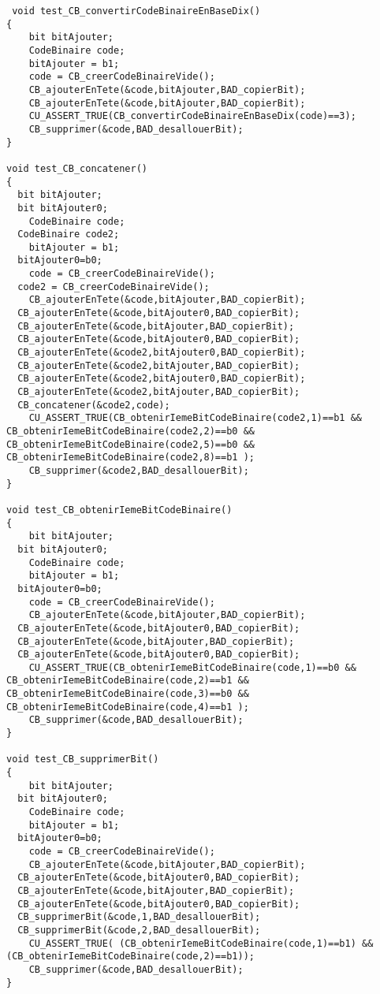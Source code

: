 \begin{verbatim}
 void test_CB_convertirCodeBinaireEnBaseDix()
{
	bit bitAjouter;
	CodeBinaire code;
	bitAjouter = b1;
	code = CB_creerCodeBinaireVide();
	CB_ajouterEnTete(&code,bitAjouter,BAD_copierBit);
	CB_ajouterEnTete(&code,bitAjouter,BAD_copierBit);
	CU_ASSERT_TRUE(CB_convertirCodeBinaireEnBaseDix(code)==3);
	CB_supprimer(&code,BAD_desallouerBit);
}

void test_CB_concatener()
{
  bit bitAjouter;
  bit bitAjouter0;
	CodeBinaire code;
  CodeBinaire code2;
	bitAjouter = b1;
  bitAjouter0=b0;
	code = CB_creerCodeBinaireVide();
  code2 = CB_creerCodeBinaireVide();
	CB_ajouterEnTete(&code,bitAjouter,BAD_copierBit);
  CB_ajouterEnTete(&code,bitAjouter0,BAD_copierBit);
  CB_ajouterEnTete(&code,bitAjouter,BAD_copierBit);
  CB_ajouterEnTete(&code,bitAjouter0,BAD_copierBit);
  CB_ajouterEnTete(&code2,bitAjouter0,BAD_copierBit);
  CB_ajouterEnTete(&code2,bitAjouter,BAD_copierBit);
  CB_ajouterEnTete(&code2,bitAjouter0,BAD_copierBit);
  CB_ajouterEnTete(&code2,bitAjouter,BAD_copierBit);
  CB_concatener(&code2,code);
	CU_ASSERT_TRUE(CB_obtenirIemeBitCodeBinaire(code2,1)==b1 && CB_obtenirIemeBitCodeBinaire(code2,2)==b0 && CB_obtenirIemeBitCodeBinaire(code2,5)==b0 && CB_obtenirIemeBitCodeBinaire(code2,8)==b1 );
	CB_supprimer(&code2,BAD_desallouerBit);
}

void test_CB_obtenirIemeBitCodeBinaire()
{
	bit bitAjouter;
  bit bitAjouter0;
	CodeBinaire code;
	bitAjouter = b1;
  bitAjouter0=b0;
	code = CB_creerCodeBinaireVide();
	CB_ajouterEnTete(&code,bitAjouter,BAD_copierBit);
  CB_ajouterEnTete(&code,bitAjouter0,BAD_copierBit);
  CB_ajouterEnTete(&code,bitAjouter,BAD_copierBit);
  CB_ajouterEnTete(&code,bitAjouter0,BAD_copierBit);
	CU_ASSERT_TRUE(CB_obtenirIemeBitCodeBinaire(code,1)==b0 && CB_obtenirIemeBitCodeBinaire(code,2)==b1 && CB_obtenirIemeBitCodeBinaire(code,3)==b0 && CB_obtenirIemeBitCodeBinaire(code,4)==b1 );
	CB_supprimer(&code,BAD_desallouerBit);
}

void test_CB_supprimerBit()
{
	bit bitAjouter;
  bit bitAjouter0;
	CodeBinaire code;
	bitAjouter = b1;
  bitAjouter0=b0;
	code = CB_creerCodeBinaireVide();
	CB_ajouterEnTete(&code,bitAjouter,BAD_copierBit);
  CB_ajouterEnTete(&code,bitAjouter0,BAD_copierBit);
  CB_ajouterEnTete(&code,bitAjouter,BAD_copierBit);
  CB_ajouterEnTete(&code,bitAjouter0,BAD_copierBit);
  CB_supprimerBit(&code,1,BAD_desallouerBit);
  CB_supprimerBit(&code,2,BAD_desallouerBit);
	CU_ASSERT_TRUE( (CB_obtenirIemeBitCodeBinaire(code,1)==b1) && (CB_obtenirIemeBitCodeBinaire(code,2)==b1));
	CB_supprimer(&code,BAD_desallouerBit);
}





\end{verbatim}
